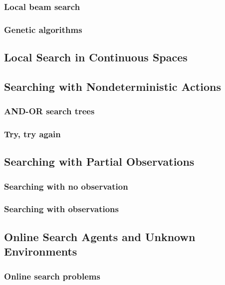 \documentclass[11pt]{article}
\begin{document}
\subsubsection{Local beam search}


\subsubsection{Genetic algorithms}


\subsection{Local Search in Continuous Spaces}



\subsection{Searching with Nondeterministic Actions}

\subsubsection{AND-OR search trees}


\subsubsection{Try, try again}


\subsection{Searching with Partial Observations}

\subsubsection{Searching with no observation}


\subsubsection{Searching with observations}


\subsection{Online Search Agents and Unknown Environments}

\subsubsection{Online search problems}
\end{document}
